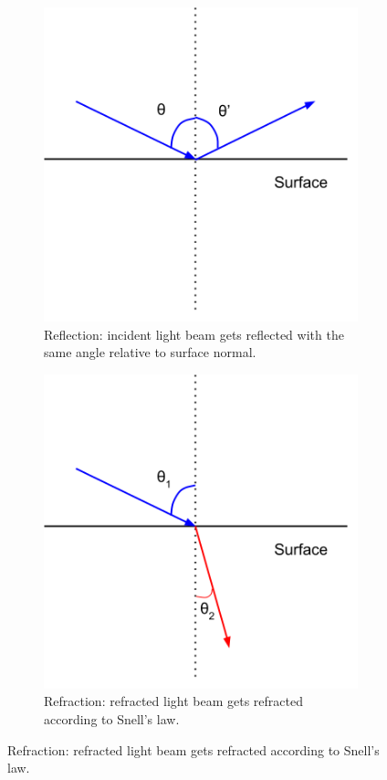 			\begin{figure}
		    \centering
		    \begin{subfigure}[t]{0.3\textwidth}
		        \includegraphics[width=\textwidth]{images/reflection.png}
		        \caption{Reflection: incident light beam gets reflected with the same angle relative to surface normal.}
		        \label{fig:reflection_def}
		    \end{subfigure}
		    
		    \begin{subfigure}[t]{0.3\textwidth}
		        \includegraphics[width=\textwidth]{images/refraction.png}
		        \caption{Refraction: refracted light beam gets refracted according to Snell's law.}	
		        \label{fig:refracted_def}
		    \end{subfigure}
		    

\end{figure}
